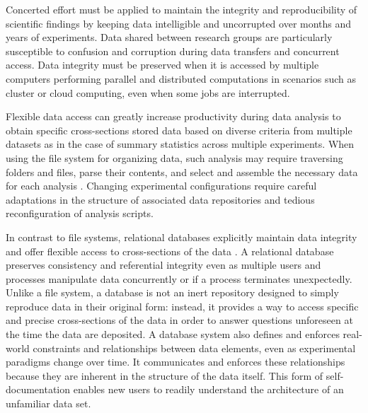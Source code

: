 \documentclass[10pt,letterpaper]{article}
\begin{document}
Concerted effort must be applied to maintain the integrity and reproducibility of scientific findings by keeping data intelligible and uncorrupted over months and years of experiments.
Data shared between research groups are particularly susceptible to confusion and corruption during data transfers and concurrent access. 
Data integrity must be preserved when it is accessed by multiple computers performing parallel and distributed computations in scenarios such as cluster or cloud computing, even when some jobs are interrupted.

Flexible data access can greatly increase productivity during data analysis to obtain specific cross-sections stored data based on diverse criteria from multiple datasets as in the case of summary statistics across multiple experiments.
When using the file system for organizing data, such analysis may require traversing folders and files, parse their contents, and select and assemble the necessary data for each analysis \cite{anderson_issues_2007}.
Changing experimental configurations require careful adaptations in the structure of associated data repositories and tedious reconfiguration of analysis scripts.

In contrast to file systems, relational databases explicitly maintain data integrity and offer flexible access to cross-sections of the data \cite{codd_relational_1970}. 
A relational database preserves consistency and referential integrity even as multiple users and processes manipulate data concurrently or if a process terminates unexpectedly.
Unlike a file system, a database is not an inert repository designed to simply reproduce data in their original form: instead, it provides a way to access specific and precise cross-sections of the data in order to answer questions unforeseen at the time the data are deposited.
A database system also defines and enforces real-world constraints and relationships between data elements, even as experimental paradigms change over time.
It communicates and enforces these relationships because they are inherent in the structure of the data itself.
This form of self-documentation enables new users to readily understand the architecture of an unfamiliar data set.
\end{document}
